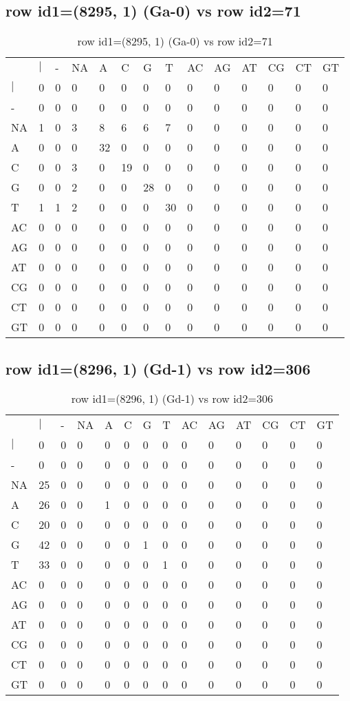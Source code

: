 \subsection{row id1=(8295, 1) (Ga-0) vs row id2=71}
\begin{center}
\begin{longtable}{|l|l|l|l|l|l|l|l|l|l|l|l|l|l|}
\caption{row id1=(8295, 1) (Ga-0) vs row id2=71} \label{table_dm468}\\
\hline
\\
\hline
&$|$&-&NA&A&C&G&T&AC&AG&AT&CG&CT&GT\\
$|$&0&0&0&0&0&0&0&0&0&0&0&0&0\\
-&0&0&0&0&0&0&0&0&0&0&0&0&0\\
NA&1&0&3&8&6&6&7&0&0&0&0&0&0\\
A&0&0&0&32&0&0&0&0&0&0&0&0&0\\
C&0&0&3&0&19&0&0&0&0&0&0&0&0\\
G&0&0&2&0&0&28&0&0&0&0&0&0&0\\
T&1&1&2&0&0&0&30&0&0&0&0&0&0\\
AC&0&0&0&0&0&0&0&0&0&0&0&0&0\\
AG&0&0&0&0&0&0&0&0&0&0&0&0&0\\
AT&0&0&0&0&0&0&0&0&0&0&0&0&0\\
CG&0&0&0&0&0&0&0&0&0&0&0&0&0\\
CT&0&0&0&0&0&0&0&0&0&0&0&0&0\\
GT&0&0&0&0&0&0&0&0&0&0&0&0&0\\
\hline
\end{longtable}
\end{center}

\subsection{row id1=(8296, 1) (Gd-1) vs row id2=306}
\begin{center}
\begin{longtable}{|l|l|l|l|l|l|l|l|l|l|l|l|l|l|}
\caption{row id1=(8296, 1) (Gd-1) vs row id2=306} \label{table_dm470}\\
\hline
\\
\hline
&$|$&-&NA&A&C&G&T&AC&AG&AT&CG&CT&GT\\
$|$&0&0&0&0&0&0&0&0&0&0&0&0&0\\
-&0&0&0&0&0&0&0&0&0&0&0&0&0\\
NA&25&0&0&0&0&0&0&0&0&0&0&0&0\\
A&26&0&0&1&0&0&0&0&0&0&0&0&0\\
C&20&0&0&0&0&0&0&0&0&0&0&0&0\\
G&42&0&0&0&0&1&0&0&0&0&0&0&0\\
T&33&0&0&0&0&0&1&0&0&0&0&0&0\\
AC&0&0&0&0&0&0&0&0&0&0&0&0&0\\
AG&0&0&0&0&0&0&0&0&0&0&0&0&0\\
AT&0&0&0&0&0&0&0&0&0&0&0&0&0\\
CG&0&0&0&0&0&0&0&0&0&0&0&0&0\\
CT&0&0&0&0&0&0&0&0&0&0&0&0&0\\
GT&0&0&0&0&0&0&0&0&0&0&0&0&0\\
\hline
\end{longtable}
\end{center}

